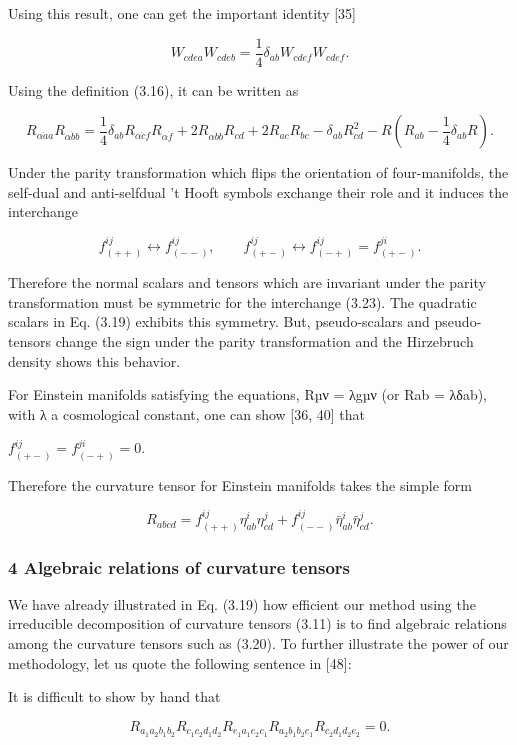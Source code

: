 \documentclass{article}
\begin{document}
Using this result, one can get the important identity [35]

$$W_{cdea}W_{cdeb}=\frac{1}{4}\delta_{ab}W_{cdef}W_{cdef}.\tag{3.21}$$

Using the definition (3.16), it can be written as

$$R_{\alpha\dot{a}a}R_{\alpha\dot{b}b}=\frac{1}{4}\delta_{ab}R_{\alpha\dot{c}f}R_{\alpha\dot{f}}+2R_{\alpha\dot{b}b}R_{cd}+2R_{ac}R_{bc}-\delta_{ab}R_{cd}^{2}-R\left(R_{ab}-\frac{1}{4}\delta_{ab}R\right).\tag{3.22}$$

Under the parity transformation which flips the orientation of four-manifolds, the self-dual and anti-selfdual 't Hooft symbols exchange their role and it induces the interchange

$$f^{ij}_{(++)}\leftrightarrow f^{ij}_{(--)},\qquad f^{ij}_{(+-)}\leftrightarrow f^{ij}_{(-+)}=f^{ji}_{(+-)}.\tag{3.23}$$

Therefore the normal scalars and tensors which are invariant under the parity transformation must be symmetric for the interchange (3.23). The quadratic scalars in Eq. (3.19) exhibits this symmetry. But, pseudo-scalars and pseudo-tensors change the sign under the parity transformation and the Hirzebruch density shows this behavior.

For Einstein manifolds satisfying the equations, Rµν = λgµν (or Rab = λδab), with λ a cosmological constant, one can show [36, 40] that

$f^{ij}_{(+-)}=f^{ji}_{(-+)}=0$.

Therefore the curvature tensor for Einstein manifolds takes the simple form

$$R_{abcd}=f^{ij}_{(++)}\eta^{i}_{ab}\eta^{j}_{cd}+f^{ij}_{(--)}\bar{\eta}^{i}_{ab}\bar{\eta}^{j}_{cd}.\tag{3.25}$$

\subsubsection{4 Algebraic relations of curvature tensors}

We have already illustrated in Eq. (3.19) how efficient our method using the irreducible decomposition of curvature tensors (3.11) is to find algebraic relations among the curvature tensors such as (3.20). To further illustrate the power of our methodology, let us quote the following sentence in [48]:

It is difficult to show by hand that

$$R_{a_{1}a_{2}b_{1}b_{2}}R_{c_{1}c_{2}d_{1}d_{2}}R_{e_{1}a_{1}e_{2}c_{1}}R_{a_{2}b_{1}b_{2}e_{1}}R_{c_{2}d_{1}d_{2}e_{2}}=0.\tag{4.1}$$
\end{document}

